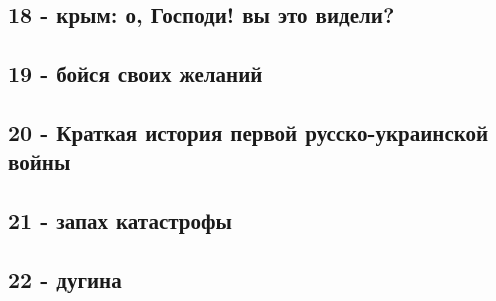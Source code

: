 \subsection{18 - крым: о, Господи! вы это видели?}

\subsection{19 - бойся своих желаний}

\subsection{20 - Краткая история первой русско-украинской войны}

\subsection{21 - запах катастрофы}

\subsection{22 - дугина}






